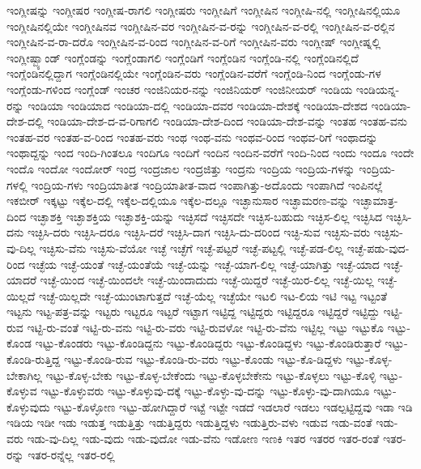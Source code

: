 {ಇಂಗ್ಲೀಷನ್ನು
ಇಂಗ್ಲೀಷರ
ಇಂಗ್ಲೀಷ-ರಾಗಲಿ
ಇಂಗ್ಲೀಷರು
ಇಂಗ್ಲೀಷಿಗೆ
ಇಂಗ್ಲೀಷಿನ
ಇಂಗ್ಲೀಷಿ-ನಲ್ಲಿ
ಇಂಗ್ಲೀಷಿನಲ್ಲಿಯೂ
ಇಂಗ್ಲೀಷಿನಲ್ಲಿಯೇ
ಇಂಗ್ಲೀಷಿನವ
ಇಂಗ್ಲೀಷಿನ-ವರ
ಇಂಗ್ಲೀಷಿನ-ವ-ರನ್ನು
ಇಂಗ್ಲೀಷಿನ-ವ-ರಲ್ಲಿ
ಇಂಗ್ಲೀಷಿನ-ವ-ರಲ್ಲಿನ
ಇಂಗ್ಲೀಷಿನ-ವ-ರಾ-ದರೊ
ಇಂಗ್ಲೀಷಿನ-ವ-ರಿಂದ
ಇಂಗ್ಲೀಷಿನ-ವ-ರಿಗೆ
ಇಂಗ್ಲೀಷಿನ-ವರು
ಇಂಗ್ಲೀಷ್
ಇಂಗ್ಲೀಷ್ನಲ್ಲಿ
ಇಂಗ್ಲೀಷ್ಬ್ಯಾಂಡ್
ಇಂಗ್ಲೆಂಡನ್ನು
ಇಂಗ್ಲೆಂಡಾಗಲಿ
ಇಂಗ್ಲೆಂಡಿಗೆ
ಇಂಗ್ಲೆಂಡಿನ
ಇಂಗ್ಲೆಂಡಿ-ನಲ್ಲಿ
ಇಂಗ್ಲೆಂಡಿನಲ್ಲಿದೆ
ಇಂಗ್ಲೆಂಡಿನಲ್ಲಿದ್ದಾಗ
ಇಂಗ್ಲೆಂಡಿನಲ್ಲಿಯೇ
ಇಂಗ್ಲೆಂಡಿನ-ವರು
ಇಂಗ್ಲೆಂಡಿನ-ವರೆಗೆ
ಇಂಗ್ಲೆಂಡಿ-ನಿಂದ
ಇಂಗ್ಲೆಂಡು-ಗಳ
ಇಂಗ್ಲೆಂಡು-ಗಳಿಂದ
ಇಂಗ್ಲೆಂಡ್
ಇಂಚರ
ಇಂಜಿನಿಯರ-ನನ್ನು
ಇಂಜಿನಿಯರ್
ಇಂಜಿನೀಯರ್
ಇಂಡಿಯ
ಇಂಡಿಯನ್ನ-ರನ್ನು
ಇಂಡಿಯಾ
ಇಂಡಿಯಾದ
ಇಂಡಿಯಾ-ದಲ್ಲಿ
ಇಂಡಿಯಾ-ದವರ
ಇಂಡಿಯಾ-ದೇಶಕ್ಕೆ
ಇಂಡಿಯಾ-ದೇಶದ
ಇಂಡಿಯಾ-ದೇಶ-ದಲ್ಲಿ
ಇಂಡಿಯಾ-ದೇಶ-ದ-ವ-ರಿಗಾಗಲಿ
ಇಂಡಿಯಾ-ದೇಶ-ದಿಂದ
ಇಂಡಿಯಾ-ದೇಶ-ವನ್ನು
ಇಂತಹ
ಇಂತಹ-ವನು
ಇಂತಹ-ವರ
ಇಂತಹ-ವ-ರಿಂದ
ಇಂತಹ-ವರು
ಇಂಥ
ಇಂಥ-ವನು
ಇಂಥವ-ರಿಂದ
ಇಂಥವ-ರಿಗೆ
ಇಂಥಾದನ್ನು
ಇಂಥಾದ್ದನ್ನು
ಇಂದ
ಇಂದಿ-ಗಿಂತಲೂ
ಇಂದಿಗೂ
ಇಂದಿಗೆ
ಇಂದಿನ
ಇಂದಿನ-ವರೆಗೆ
ಇಂದಿ-ನಿಂದ
ಇಂದು
ಇಂದೂ
ಇಂದೇ
ಇಂದೊ
ಇಂದೋ
ಇಂದೋರ್
ಇಂದ್ರ
ಇಂದ್ರಜಾಲ
ಇಂದ್ರಜಿತ್ತು
ಇಂದ್ರನು
ಇಂದ್ರಿಯ
ಇಂದ್ರಿಯ-ಗಳನ್ನು
ಇಂದ್ರಿಯ-ಗಳಲ್ಲಿ
ಇಂದ್ರಿಯ-ಗಳು
ಇಂದ್ರಿಯಾತೀತ
ಇಂದ್ರಿಯಾತೀತ-ವಾದ
ಇಂಪಾಗಿತ್ತು-ಅದೊಂದು
ಇಂಪಾಗಿದೆ
ಇಂಪಿನಲ್ಲೆ
ಇಕಬೀರ್
ಇಕ್ಕಟ್ಟು
ಇಕ್ಕೆಲ-ದಲ್ಲಿ
ಇಕ್ಕೆಲ-ದಲ್ಲಿಯೂ
ಇಕ್ಕೆಲ-ದಲ್ಲೂ
ಇಚ್ಛಾನುಸಾರ
ಇಚ್ಛಾಮರಣ-ವನ್ನು
ಇಚ್ಛಾಮಾತ್ರ-ದಿಂದ
ಇಚ್ಛಾಶಕ್ತಿ
ಇಚ್ಛಾಶಕ್ತಿಯ
ಇಚ್ಛಾಶಕ್ತಿ-ಯನ್ನು
ಇಚ್ಛಿಸದೆ
ಇಚ್ಛಿಸದೇ
ಇಚ್ಛಿಸ-ಬಹುದು
ಇಚ್ಛಿಸ-ಲಿಲ್ಲ
ಇಚ್ಛಿಸಿದ
ಇಚ್ಛಿಸಿ-ದನು
ಇಚ್ಛಿಸಿ-ದರು
ಇಚ್ಛಿಸಿ-ದರೂ
ಇಚ್ಛಿಸಿ-ದರೆ
ಇಚ್ಛಿಸಿ-ದಾಗ
ಇಚ್ಛಿಸಿ-ದು-ದರಿಂದ
ಇಚ್ಛಿ-ಸುವ
ಇಚ್ಛಿಸು-ವರು
ಇಚ್ಛಿಸು-ವು-ದಿಲ್ಲ
ಇಚ್ಛಿಸು-ವೆನು
ಇಚ್ಛಿಸು-ವೆಯೋ
ಇಚ್ಛೆ
ಇಚ್ಛೆಗೆ
ಇಚ್ಛೆ-ಪಟ್ಟರೆ
ಇಚ್ಛೆ-ಪಟ್ಟಲ್ಲಿ
ಇಚ್ಛೆ-ಪಡ-ಲಿಲ್ಲ
ಇಚ್ಛೆ-ಪಡು-ವುದ-ರಿಂದ
ಇಚ್ಛೆಯ
ಇಚ್ಛೆ-ಯಂತೆ
ಇಚ್ಛೆ-ಯಂತೆಯೆ
ಇಚ್ಛೆ-ಯನ್ನು
ಇಚ್ಛೆ-ಯಾಗ-ಲಿಲ್ಲ
ಇಚ್ಛೆ-ಯಾಗಿತ್ತು
ಇಚ್ಛೆ-ಯಾದ
ಇಚ್ಛೆ-ಯಾದರೆ
ಇಚ್ಛೆ-ಯಿಂದ
ಇಚ್ಛೆ-ಯಿಂದಲೇ
ಇಚ್ಛೆ-ಯಿಂದಾದುದು
ಇಚ್ಛೆ-ಯಿದ್ದರೆ
ಇಚ್ಛೆ-ಯಿರ-ಲಿಲ್ಲ
ಇಚ್ಛೆ-ಯಿಲ್ಲ
ಇಚ್ಛೆ-ಯಿಲ್ಲದೆ
ಇಚ್ಛೆ-ಯಿಲ್ಲದೇ
ಇಚ್ಛೆ-ಯುಂಟಾಗುತ್ತದೆ
ಇಚ್ಛೆ-ಯೆಲ್ಲ
ಇಚ್ಛೆಯೇ
ಇಟಲಿ
ಇಟ-ಲಿಯ
ಇಟಿ
ಇಟ್ಟ
ಇಟ್ಟಂತೆ
ಇಟ್ಟನು
ಇಟ್ಟ-ಪತ್ರ-ವನ್ನು
ಇಟ್ಟರು
ಇಟ್ಟರೂ
ಇಟ್ಟರೆ
ಇಟ್ಟಾಗ
ಇಟ್ಟಿದ್ದ
ಇಟ್ಟಿದ್ದರು
ಇಟ್ಟಿದ್ದರೂ
ಇಟ್ಟಿದ್ದರೆ
ಇಟ್ಟಿದ್ದು
ಇಟ್ಟಿ-ರುವ
ಇಟ್ಟಿ-ರು-ವಂತೆ
ಇಟ್ಟಿ-ರು-ವನು
ಇಟ್ಟಿ-ರು-ವರು
ಇಟ್ಟಿ-ರುವಳೋ
ಇಟ್ಟಿ-ರು-ವೆನು
ಇಟ್ಟಿಲ್ಲ
ಇಟ್ಟು
ಇಟ್ಟುಕೊ
ಇಟ್ಟು-ಕೊಂಡ
ಇಟ್ಟು-ಕೊಂಡರು
ಇಟ್ಟು-ಕೊಂಡಿದ್ದನು
ಇಟ್ಟು-ಕೊಂಡಿದ್ದರು
ಇಟ್ಟು-ಕೊಂಡಿದ್ದಳು
ಇಟ್ಟು-ಕೊಂಡಿರುತ್ತಾರೆ
ಇಟ್ಟು-ಕೊಂಡಿ-ರುತ್ತಿದ್ದ
ಇಟ್ಟು-ಕೊಂಡಿ-ರುವ
ಇಟ್ಟು-ಕೊಂಡಿ-ರು-ವರು
ಇಟ್ಟು-ಕೊಂಡು
ಇಟ್ಟು-ಕೊ-ಡಿದ್ದಳು
ಇಟ್ಟು-ಕೊಳ್ಳ-ಬೇಕಾಗಿಲ್ಲ
ಇಟ್ಟು-ಕೊಳ್ಳ-ಬೇಕು
ಇಟ್ಟು-ಕೊಳ್ಳ-ಬೇಕೆಂದು
ಇಟ್ಟು-ಕೊಳ್ಳಬೇಕೇನು
ಇಟ್ಟು-ಕೊಳ್ಳಲು
ಇಟ್ಟು-ಕೊಳ್ಳಿ
ಇಟ್ಟು-ಕೊಳ್ಳುವ
ಇಟ್ಟು-ಕೊಳ್ಳುವರು
ಇಟ್ಟು-ಕೊಳ್ಳುವು-ದಕ್ಕೆ
ಇಟ್ಟು-ಕೊಳ್ಳು-ವು-ದನ್ನು
ಇಟ್ಟು-ಕೊಳ್ಳು-ವು-ದಾಗಿಯೂ
ಇಟ್ಟು-ಕೊಳ್ಳುವುದು
ಇಟ್ಟು-ಕೊಳ್ಳೋಣ
ಇಟ್ಟು-ಹೋಗಿದ್ದಾರೆ
ಇಟ್ಟೆ
ಇಟ್ಟೇ
ಇಡದೆ
ಇಡಲಾರೆ
ಇಡಲು
ಇಡಲ್ಪಟ್ಟಿದ್ದವು
ಇಡಾ
ಇಡಿ
ಇಡಿಯ
ಇಡೀ
ಇಡು
ಇಡುತ್ತ
ಇಡುತ್ತಿತ್ತು
ಇಡುತ್ತಿದ್ದರು
ಇಡುತ್ತಿದ್ದಳು
ಇಡುತ್ತಿರು-ವಳು
ಇಡುವ
ಇಡು-ವಂತೆ
ಇಡು-ವರು
ಇಡು-ವು-ದಿಲ್ಲ
ಇಡು-ವುದು
ಇಡು-ವುದೋ
ಇಡು-ವೆನು
ಇಡೋಣ
ಇಣಕಿ
ಇತರ
ಇತರರ
ಇತರ-ರಂತೆ
ಇತರ-ರನ್ನು
ಇತರ-ರನ್ನೆಲ್ಲ
ಇತರ-ರಲ್ಲಿ
}
